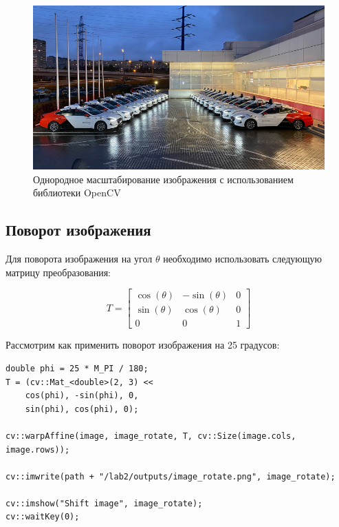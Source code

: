 \begin{figure}[ht]
    \includegraphics[width=\textwidth]{../outputs/image_resize.png}
    \caption{Однородное масштабирование изображения с использованием библиотеки OpenCV}
    \label{fig:uniform_scale_image_cv}
\end{figure}

\subsection{Поворот изображения}

Для поворота изображения на угол $\theta$ необходимо использовать следующую матрицу преобразования:

\begin{equation}
T = \begin{bmatrix}
    \cos(\theta) & -\sin(\theta) & 0 \\
    \sin(\theta) & \cos(\theta) & 0 \\
    0 & 0 & 1
\end{bmatrix}
\end{equation}

Рассмотрим как применить поворот изображения на 25 градусов:
\begin{lstlisting}[style=cpp_white, caption={Исходный код для поворота изображения}]
double phi = 25 * M_PI / 180;
T = (cv::Mat_<double>(2, 3) << 
    cos(phi), -sin(phi), 0, 
    sin(phi), cos(phi), 0); 

cv::warpAffine(image, image_rotate, T, cv::Size(image.cols, image.rows)); 

cv::imwrite(path + "/lab2/outputs/image_rotate.png", image_rotate);

cv::imshow("Shift image", image_rotate); 
cv::waitKey(0); 
\end{lstlisting}

